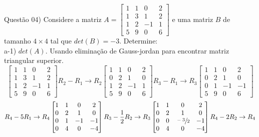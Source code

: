 
\noindent \textcolor{COLOR1}{Questão 04)} Considere a matriz $A = \begin{bmatrix}
        1 & 1 & 0  & 2 \\
        1 & 3 & 1  & 2 \\
        1 & 2 & -1 & 1 \\
        5 & 9 & 0  & 6
    \end{bmatrix}$ e uma matriz $B$ de tamanho $4\times 4$ tal que $det(B)=-3$. Determine:
\\

a-1) $det(A)$. Usando eliminação de Gauss-jordan para encontrar matriz triangular superior.
\\

\[
    \begin{bmatrix}
        1 & 1 & 0  & 2 \\
        1 & 3 & 1  & 2 \\
        1 & 2 & -1 & 1 \\
        5 & 9 & 0  & 6
    \end{bmatrix}
    R_2 - R_1 \to R_2
    \begin{bmatrix}
        1 & 1 & 0  & 2 \\
        0 & 2 & 1  & 0 \\
        1 & 2 & -1 & 1 \\
        5 & 9 & 0  & 6
    \end{bmatrix}
    R_3 - R_1 \to  R_3
    \begin{bmatrix}
        1 & 1 & 0  & 2  \\
        0 & 2 & 1  & 0  \\
        0 & 1 & -1 & -1 \\
        5 & 9 & 0  & 6
    \end{bmatrix}
\]
\[
    R_4 - 5R_1\to  R_4
    \begin{bmatrix}
        1 & 1 & 0  & 2  \\
        0 & 2 & 1  & 0  \\
        0 & 1 & -1 & -1 \\
        0 & 4 & 0  & -4
    \end{bmatrix}
    R_3 - \frac{1}{2} R_2\to  R_3
    \begin{bmatrix}
        1 & 1 & 0             & 2  \\
        0 & 2 & 1             & 0  \\
        0 & 0 & \sfrac{-3}{2} & -1 \\
        0 & 4 & 0             & -4
    \end{bmatrix}
    R_4 - 2R_2 \to R_4
\]
